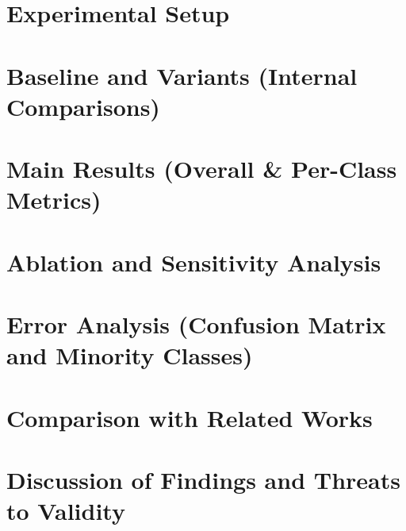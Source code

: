 \section{Experimental Setup}

\section{Baseline and Variants (Internal Comparisons)}

\section{Main Results (Overall \& Per-Class Metrics)}

\section{Ablation and Sensitivity Analysis}

\section{Error Analysis (Confusion Matrix and Minority Classes)}

\section{Comparison with Related Works}

\section{Discussion of Findings and Threats to Validity}


